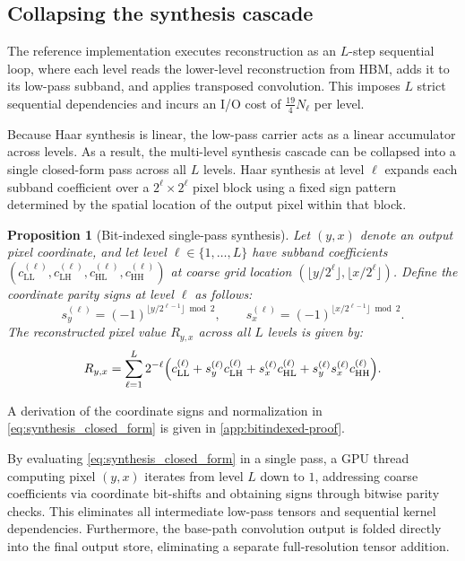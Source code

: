 \documentclass[10pt]{article} %
\theoremstyle{plain}
\newtheorem{proposition}{Proposition}
\begin{document}
\subsection{Collapsing the synthesis cascade}
\label{sec:synthesis}

The reference implementation executes reconstruction as an $L$-step sequential loop, where each level reads the lower-level reconstruction from HBM, adds it to its low-pass subband, and applies transposed convolution. This imposes $L$ strict sequential dependencies and incurs an I/O cost of $\tfrac{19}{4}N_\ell$ per level.

Because Haar synthesis is linear, the low-pass carrier acts as a linear accumulator across levels. As a result, the multi-level synthesis cascade can be collapsed into a single closed-form pass across all $L$ levels. Haar synthesis at level $\ell$ expands each subband coefficient over a $2^\ell \times 2^\ell$ pixel block using a fixed sign pattern determined by the spatial location of the output pixel within that block.

\begin{proposition}[Bit-indexed single-pass synthesis]
\label{prop:bitindexed}
Let $(y,x)$ denote an output pixel coordinate, and let level $\ell \in \{1,\dots,L\}$ have subband coefficients $(c^{(\ell)}_{\mathrm{LL}},c^{(\ell)}_{\mathrm{LH}},c^{(\ell)}_{\mathrm{HL}},c^{(\ell)}_{\mathrm{HH}})$ at coarse grid location $(\lfloor y / 2^\ell \rfloor, \lfloor x / 2^\ell \rfloor)$. Define the coordinate parity signs at level $\ell$ as follows:
\begin{equation}
s_y^{(\ell)} = (-1)^{\lfloor y / 2^{\ell-1} \rfloor \bmod 2}, \qquad
s_x^{(\ell)} = (-1)^{\lfloor x / 2^{\ell-1} \rfloor \bmod 2}.
\end{equation}
The reconstructed pixel value $R_{y,x}$ across all $L$ levels is given by:
\begin{equation}
R_{y,x} = \sum_{\ell=1}^{L} 2^{-\ell} \Bigl(
  c^{(\ell)}_{\mathrm{LL}} +
  s_y^{(\ell)} c^{(\ell)}_{\mathrm{LH}} +
  s_x^{(\ell)} c^{(\ell)}_{\mathrm{HL}} +
  s_y^{(\ell)} s_x^{(\ell)} c^{(\ell)}_{\mathrm{HH}}
\Bigr).
\label{eq:synthesis_closed_form}
\end{equation}
\end{proposition}

A derivation of the coordinate signs and normalization in
\autoref{eq:synthesis_closed_form} is given in \autoref{app:bitindexed-proof}.

By evaluating \autoref{eq:synthesis_closed_form} in a single pass, a GPU thread computing pixel $(y,x)$ iterates from level $L$ down to $1$, addressing coarse coefficients via coordinate bit-shifts and obtaining signs through bitwise parity checks. This eliminates all intermediate low-pass tensors and sequential kernel dependencies. Furthermore, the base-path convolution output is folded directly into the final output store, eliminating a separate full-resolution tensor addition.
\end{document}
